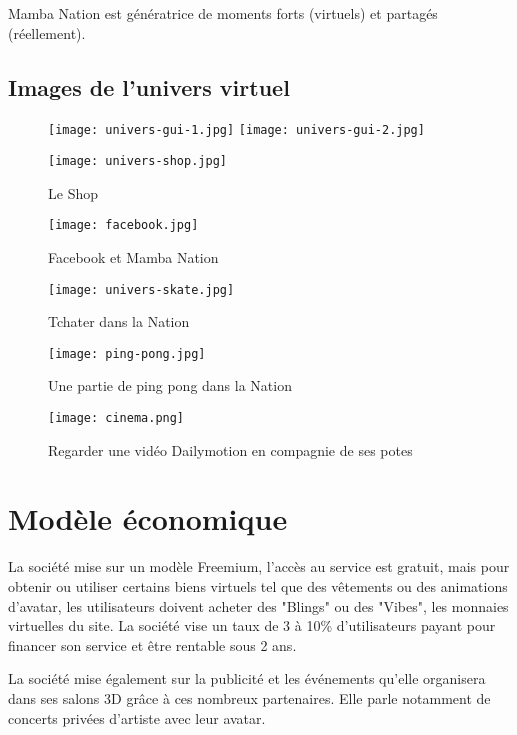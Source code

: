 Mamba Nation est génératrice de moments forts (virtuels) et partagés
(réellement).

\subsection{Images de l'univers virtuel} 

\begin{figure}[H]
  \texttt{[image: univers-gui-1.jpg]}
  \texttt{[image: univers-gui-2.jpg]}
\end{figure}

\begin{figure}[H]
  \texttt{[image: univers-shop.jpg]}
  \caption{Le Shop}
\end{figure}

\begin{figure}[H]
  \texttt{[image: facebook.jpg]}
  \caption{Facebook et Mamba Nation}
\end{figure}

\begin{figure}[H]
  \texttt{[image: univers-skate.jpg]}
  \caption{Tchater dans la Nation}
\end{figure}

\begin{figure}[H]
  \texttt{[image: ping-pong.jpg]}
  \caption{Une partie de ping pong dans la Nation}
\end{figure}

\begin{figure}[H]
  \texttt{[image: cinema.png]}
  \caption{Regarder une vidéo Dailymotion en compagnie de ses potes}
\end{figure}


\section{Modèle économique}

La société mise sur un modèle Freemium, l'accès au service est gratuit, mais
pour obtenir ou utiliser certains biens virtuels tel que des vêtements ou des
animations d'avatar, les utilisateurs doivent acheter des "Blings" ou des
"Vibes", les monnaies virtuelles du site. La société vise un taux de 3 à 10\%
d'utilisateurs payant pour financer son service et être rentable sous 2 ans.

La société mise également sur la publicité et les événements qu'elle organisera
dans ses salons 3D grâce à ces nombreux partenaires. Elle parle notamment de
concerts privées d'artiste avec leur avatar.

